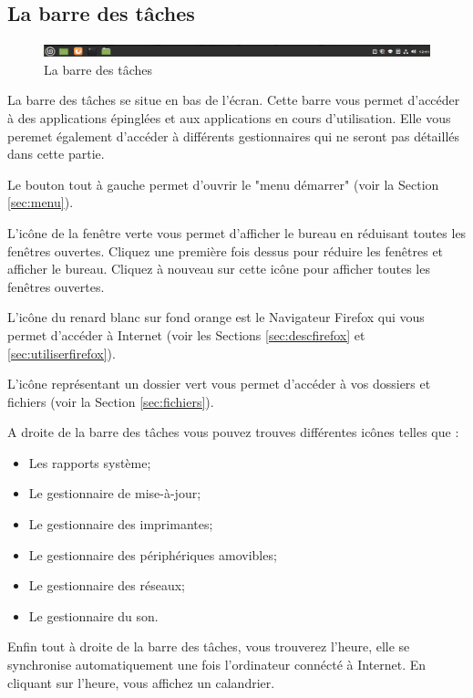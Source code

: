 \documentclass[12pt]{book}
\begin{document}
	\subsection{La barre des tâches}\label{sec:barretaches}
		\begin{figure}[h]
			\centering
			\includegraphics[width=\textwidth]{include/barretaches.png}
			\caption{La barre des tâches}
			\label{fig:barretaches}
		\end{figure}
		La barre des tâches se situe en bas de l'écran.
		Cette barre vous permet d'accéder à des applications épinglées et aux applications en cours d'utilisation.
		Elle vous peremet également d'accéder à différents gestionnaires qui ne seront pas détaillés dans cette partie.\par
		Le bouton tout à gauche permet d'ouvrir le "menu démarrer" (voir la Section \ref{sec:menu}).\par
		L'icône de la fenêtre verte vous permet d'afficher le bureau en réduisant toutes les fenêtres ouvertes. 
		Cliquez une première fois dessus pour réduire les fenêtres et afficher le bureau. 
		Cliquez à nouveau sur cette icône pour afficher toutes les fenêtres ouvertes.\par
		L'icône du renard blanc sur fond orange est le Navigateur Firefox qui vous permet d'accéder à Internet (voir les Sections \ref{sec:descfirefox} et \ref{sec:utiliserfirefox}).\par
		L'icône représentant un dossier vert vous permet d'accéder à vos dossiers et fichiers (voir la Section \ref{sec:fichiers}).\par
		A droite de la barre des tâches vous pouvez trouves différentes icônes telles que :
		\begin{itemize}
			\item Les rapports système;
			\item Le gestionnaire de mise-à-jour;
			\item Le gestionnaire des imprimantes;
			\item Le gestionnaire des périphériques amovibles;
			\item Le gestionnaire des réseaux;
			\item Le gestionnaire du son.
		\end{itemize}\par
		Enfin tout à droite de la barre des tâches, vous trouverez l'heure, elle se synchronise automatiquement une fois l'ordinateur connécté à Internet.
		En cliquant sur l'heure, vous affichez un calandrier.
\end{document}
